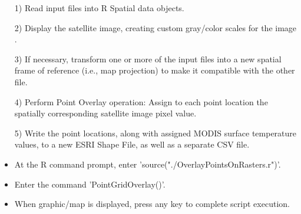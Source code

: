 \documentclass{beamer}
\begin{document}
\begin{frame}
\begin{itemize}

\item[1)] Read input files into R Spatial data objects.

\item[2)] Display the satellite image, creating custom gray/color scales for the image .
\item[3)] If necessary, transform one or more of the input files into a new spatial frame of reference (i.e., map projection) to make it compatible with the other file.

\item[4)] Perform Point Overlay operation: Assign to each point location the spatially corresponding satellite image pixel value.

\item[5)] Write the point locations, along with assigned MODIS surface temperature values, to a new ESRI Shape File, as well as a separate CSV file.
\end{itemize}
\end{frame}
\begin{frame}
\begin{itemize}
\item 
 At the R command prompt, enter 'source("./OverlayPointsOnRasters.r")'.

\item Enter the command 'PointGridOverlay()'.

\item When graphic/map is displayed, press any key to complete script execution.
\end{itemize}
\end{frame}
\end{document}
